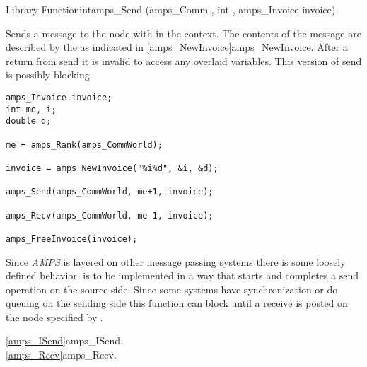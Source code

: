 
\begin{deftypefn}{Library Function}{int}{amps\_Send}
(amps_Comm , int , amps_Invoice invoice)

\DESCRIPTION

Sends a message to the node with  in the  context.
The contents of the message are described by the  as
indicated in \vref{amps_NewInvoice}{amps\_NewInvoice}.  After a return
from send it is invalid to access any overlaid variables.  This
version of send is possibly blocking.

\EXAMPLE
\begin{display}\begin{verbatim}
amps_Invoice invoice;
int me, i;
double d;

me = amps_Rank(amps_CommWorld);

invoice = amps_NewInvoice("%i%d", &i, &d);

amps_Send(amps_CommWorld, me+1, invoice);

amps_Recv(amps_CommWorld, me-1, invoice);

amps_FreeInvoice(invoice);

\end{verbatim}\end{display}

\NOTES

Since {\em AMPS} is layered on other message passing systems there is
some loosely defined behavior.   is to be implemented
in a way that starts and completes a send operation on the source
side.  Since some systems have synchronization or do queuing on the
sending side this function can block until a receive is posted on the
node specified by .

\SEEALSO
\vref{amps_ISend}{amps\_ISend}. \\
\vref{amps_Recv}{amps\_Recv}. \\

\end{deftypefn}


